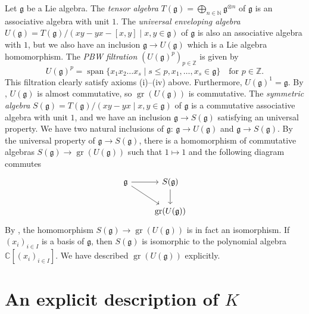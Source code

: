\documentclass[a4paper, 12pt, reqno]{amsart}
\theoremstyle{remark}
\numberwithin{equation}{subsection}
\DeclareMathOperator{\gr}{gr}
\DeclareMathOperator{\vspan}{span}
\begin{document}
Let $\mathfrak{g}$ be a Lie algebra.
The \emph{tensor algebra} $T(\mathfrak{g}) = \bigoplus_{n \in \mathbb{N}}\mathfrak{g}^{\otimes n}$ of $\mathfrak{g}$ is an associative algebra with unit $1$.
The \emph{universal enveloping algebra} $U(\mathfrak{g}) = T(\mathfrak{g})/(xy - yx - [x, y] \mid x, y \in \mathfrak{g})$ of $\mathfrak{g}$ is also an associative algebra with $1$, but we also have an inclusion $\mathfrak{g} \to U(\mathfrak{g})$ which is a Lie algebra homomorphism.
The \emph{PBW filtration} $(U(\mathfrak{g})^p)_{p \in \mathbb{Z}}$ is given by
\begin{equation*}
  U(\mathfrak{g})^p = \vspan\{x_1x_2\dots x_s \mid s \le p, x_1, \dots, x_s \in \mathfrak{g}\} \quad \text{for }p \in \mathbb{Z}.
\end{equation*}
This filtration clearly satisfy axioms (i)--(iv) above.
Furthermore, $U(\mathfrak{g})^1 = \mathfrak{g}$.
By \cite[Lemma 2.1.5]{dixmier_enveloping_1996}, $U(\mathfrak{g})$ is almost commutative, so $\gr(U(\mathfrak{g}))$ is commutative.
The \emph{symmetric algebra} $S(\mathfrak{g}) = T(\mathfrak{g})/(xy - yx \mid x, y \in \mathfrak{g})$ of $\mathfrak{g}$ is a commutative associative algebra with unit $1$, and we have an inclusion $\mathfrak{g} \to S(\mathfrak{g})$ satisfying an universal property.
We have two natural inclusions of $\mathfrak{g}$: $\mathfrak{g} \to U(\mathfrak{g})$ and $\mathfrak{g} \to S(\mathfrak{g})$.
By the universal property of $\mathfrak{g} \to S(\mathfrak{g})$, there is a homomorphism of commutative algebras $S(\mathfrak{g}) \to \gr(U(\mathfrak{g}))$ such that $1 \mapsto 1$ and the following diagram commutes
\begin{equation*}
  \begin{tikzcd}
    \mathfrak{g} \arrow[r] \arrow[rd] & S(\mathfrak{g}) \arrow[d] \\
    & \gr(U(\mathfrak{g}))
  \end{tikzcd}
\end{equation*}
By \cite[Proposition 2.3.6]{dixmier_enveloping_1996}, the homomorphism $S(\mathfrak{g}) \to \gr(U(\mathfrak{g}))$ is in fact an isomorphism.
If $(x_i)_{i \in I}$ is a basis of $\mathfrak{g}$, then $S(\mathfrak{g})$ is isomorphic to the polynomial algebra $\mathbb{C}[(x_i)_{i \in I}]$.
We have described $\gr(U(\mathfrak{g}))$ explicitly.

\section{An explicit description of $K$}
\label{sec:an-expl-descr}
\end{document}
